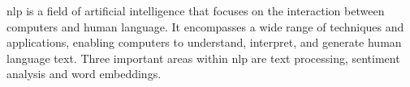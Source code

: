 \ac{nlp} is a field of artificial intelligence that focuses on the interaction between computers and human language. It encompasses a wide range of techniques and applications, enabling computers to understand, interpret, and generate human language text. Three important areas within \acs{nlp} are text processing, sentiment analysis and word embeddings.